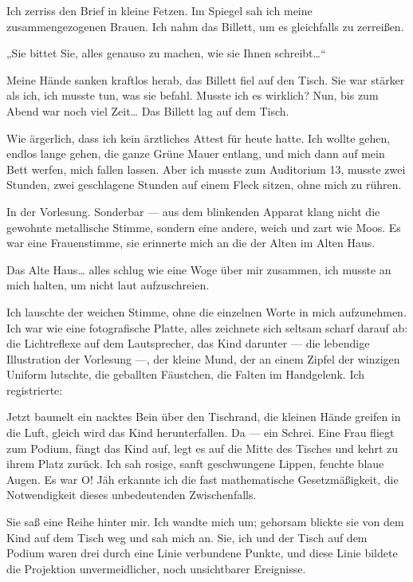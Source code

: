 Ich zerriss den Brief in kleine Fetzen. Im Spiegel sah ich meine
zusammengezogenen Brauen. Ich nahm das Billett, um es gleichfalls
zu zerreißen.

„Sie bittet Sie, alles genauso zu machen, wie sie Ihnen schreibt\ldots{}“

Meine Hände sanken kraftlos herab, das Billett fiel auf den Tisch.
Sie war stärker als ich, ich musste tun, was sie befahl. Musste ich
es wirklich? Nun, bis zum Abend war noch viel Zeit\ldots{} Das Billett
lag auf dem Tisch.

Wie ärgerlich, dass ich kein ärztliches Attest
für heute hatte. Ich wollte gehen, endlos lange gehen, die ganze
Grüne Mauer entlang, und mich dann auf mein Bett werfen, mich
fallen lassen. Aber ich musste zum Auditorium 13, musste zwei
Stunden, zwei geschlagene Stunden auf einem Fleck sitzen, ohne mich
zu rühren.

\bigpar
In der Vorlesung. Sonderbar — aus dem blinkenden Apparat klang
nicht die gewohnte metallische Stimme, sondern eine andere, weich
und zart wie Moos. Es war eine Frauenstimme, sie erinnerte mich an
die der Alten im Alten Haus.

Das Alte Haus\ldots{} alles schlug wie eine Woge über mir zusammen, ich
musste an mich halten, um nicht laut aufzuschreien.

Ich lauschte der weichen Stimme, ohne die einzelnen Worte in mich
aufzunehmen. Ich war wie eine fotografische Platte, alles zeichnete
sich seltsam scharf darauf ab: die Lichtreflexe auf dem
Lautsprecher, das Kind darunter — die lebendige Illustration der
Vorlesung —, der kleine Mund, der an einem Zipfel der winzigen
Uniform lutschte, die geballten Fäustchen, die Falten im
Handgelenk. Ich registrierte:

Jetzt baumelt ein nacktes Bein über
den Tischrand, die
kleinen Hände greifen in die Luft, gleich wird das Kind
herunterfallen. Da — ein Schrei. Eine Frau fliegt zum Podium, fängt
das Kind auf, legt es auf die Mitte des Tisches und kehrt zu ihrem
Platz zurück. Ich sah rosige, sanft geschwungene Lippen, feuchte
blaue Augen. Es war O! Jäh erkannte ich die fast mathematische
Gesetzmäßigkeit, die Notwendigkeit dieses unbedeutenden
Zwischenfalls.

Sie saß eine Reihe hinter mir. Ich wandte mich um; gehorsam blickte
sie von dem Kind auf dem Tisch weg und sah mich an. Sie, ich und
der Tisch auf dem Podium waren drei durch eine Linie verbundene
Punkte, und diese Linie bildete die Projektion unvermeidlicher,
noch unsichtbarer Ereignisse.

